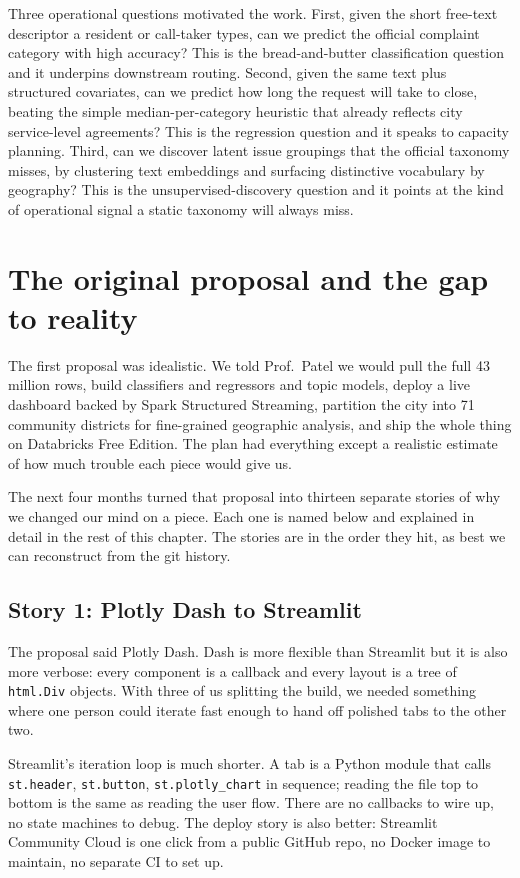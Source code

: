 \documentclass[11pt,letterpaper]{book}
\begin{document}
Three operational questions motivated the work. First, given the short free-text descriptor a resident or call-taker types, can we predict the official complaint category with high accuracy? This is the bread-and-butter classification question and it underpins downstream routing. Second, given the same text plus structured covariates, can we predict how long the request will take to close, beating the simple median-per-category heuristic that already reflects city service-level agreements? This is the regression question and it speaks to capacity planning. Third, can we discover latent issue groupings that the official taxonomy misses, by clustering text embeddings and surfacing distinctive vocabulary by geography? This is the unsupervised-discovery question and it points at the kind of operational signal a static taxonomy will always miss.

\section{The original proposal and the gap to reality}

The first proposal was idealistic. We told Prof.\ Patel we would pull the full 43 million rows, build classifiers and regressors and topic models, deploy a live dashboard backed by Spark Structured Streaming, partition the city into 71 community districts for fine-grained geographic analysis, and ship the whole thing on Databricks Free Edition. The plan had everything except a realistic estimate of how much trouble each piece would give us.

The next four months turned that proposal into thirteen separate stories of why we changed our mind on a piece. Each one is named below and explained in detail in the rest of this chapter. The stories are in the order they hit, as best we can reconstruct from the git history.

\subsection*{Story 1: Plotly Dash to Streamlit}

The proposal said Plotly Dash. Dash is more flexible than Streamlit but it is also more verbose: every component is a callback and every layout is a tree of \texttt{html.Div} objects. With three of us splitting the build, we needed something where one person could iterate fast enough to hand off polished tabs to the other two.

Streamlit's iteration loop is much shorter. A tab is a Python module that calls \texttt{st.header}, \texttt{st.button}, \texttt{st.plotly\_chart} in sequence; reading the file top to bottom is the same as reading the user flow. There are no callbacks to wire up, no state machines to debug. The deploy story is also better: Streamlit Community Cloud is one click from a public GitHub repo, no Docker image to maintain, no separate CI to set up.
\end{document}
